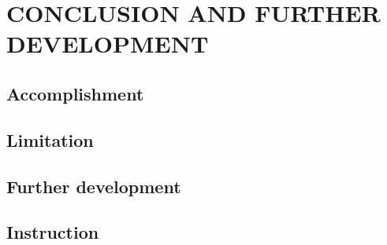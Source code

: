 \chapter{CONCLUSION AND FURTHER DEVELOPMENT}

\section{Accomplishment}
\section{Limitation}
\section{Further development}
\section{Instruction}
